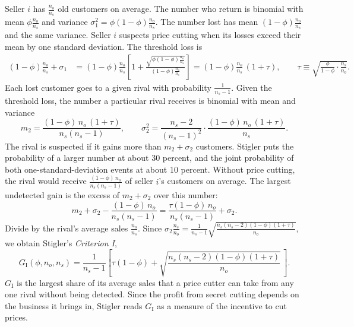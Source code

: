 Seller $i$ has $\frac{n_o}{n_s}$ old customers on average. The number who return is binomial with mean
$\phi\frac{n_o}{n_s}$ and variance $\sigma_1^2 = \phi(1 - \phi)\frac{n_o}{n_s}$. The number lost has mean
$(1 - \phi)\frac{n_o}{n_s}$ and the same variance. Seller $i$ suspects price cutting when its losses exceed their
mean by one standard deviation. The threshold loss is
\begin{align*}
(1 - \phi)\frac{n_o}{n_s} + \sigma_1
&= (1 - \phi)\frac{n_o}{n_s}\left[1 + \frac{\sqrt{\phi(1 - \phi)\frac{n_o}{n_s}}}{(1 - \phi)\frac{n_o}{n_s}}\right]
= (1 - \phi)\frac{n_o}{n_s}\,(1 + \tau),
\qquad
\tau \equiv \sqrt{\frac{\phi}{1 - \phi}\cdot\frac{n_s}{n_o}} .
\end{align*}
Each lost customer goes to a given rival with probability $\frac{1}{n_s - 1}$. Given the threshold loss, the number a
particular rival receives is binomial with mean and variance
\begin{equation*}
m_2 = \frac{(1 - \phi)\,n_o\,(1 + \tau)}{n_s(n_s - 1)}, \qquad
\sigma_2^2 = \frac{n_s - 2}{(n_s - 1)^2}\cdot\frac{(1 - \phi)\,n_o\,(1 + \tau)}{n_s} .
\end{equation*}
The rival is suspected if it gains more than $m_2 + \sigma_2$ customers. Stigler puts the probability of a larger
number at about 30 percent, and the joint probability of both one-standard-deviation events at about 10 percent.
Without price cutting, the rival would receive $\frac{(1 - \phi)\,n_o}{n_s(n_s - 1)}$ of seller $i$'s customers on
average. The largest undetected gain is the excess of $m_2 + \sigma_2$ over this number:
\begin{equation*}
m_2 + \sigma_2 - \frac{(1 - \phi)\,n_o}{n_s(n_s - 1)} = \frac{\tau(1 - \phi)\,n_o}{n_s(n_s - 1)} + \sigma_2 .
\end{equation*}
Divide by the rival's average sales $\frac{n_o}{n_s}$. Since
$\sigma_2\frac{n_s}{n_o} = \frac{1}{n_s - 1}\sqrt{\frac{n_s(n_s - 2)(1 - \phi)(1 + \tau)}{n_o}}$, we obtain Stigler's
\emph{Criterion I},
\begin{equation}\label{eq:02-stigler-crit1}
G_{\mathrm{I}}(\phi, n_o, n_s) = \frac{1}{n_s - 1}\left[\tau(1 - \phi)
+ \sqrt{\frac{n_s(n_s - 2)(1 - \phi)(1 + \tau)}{n_o}}\,\right].
\end{equation}
$G_{\mathrm{I}}$ is the largest share of its average sales that a price cutter can take from any one rival without
being detected. Since the profit from secret cutting depends on the business it brings in, Stigler reads
$G_{\mathrm{I}}$ as a measure of the incentive to cut prices.

